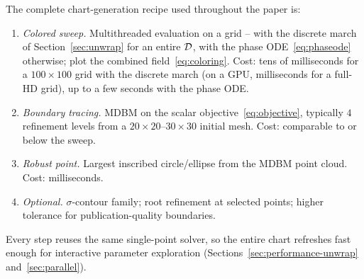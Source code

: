 The complete chart-generation recipe used throughout the paper is:
\begin{enumerate}
  \item \emph{Colored sweep.} Multithreaded evaluation on a grid -- with the
    discrete march of Section~\ref{sec:unwrap} for an entire $\mathcal{D}$, with
    the phase ODE~\eqref{eq:phaseode} otherwise; plot the combined
    field~\eqref{eq:coloring}. Cost: tens of milliseconds for a
    $100\times100$ grid with the discrete march (on a GPU, milliseconds for
    a full-HD grid), up to a few seconds with the phase ODE.
  \item \emph{Boundary tracing.} MDBM on the scalar
    objective~\eqref{eq:objective}, typically $4$ refinement levels from a
    $20\times20$--$30\times30$ initial mesh. Cost: comparable to or below
    the sweep.
  \item \emph{Robust point.} Largest inscribed circle/ellipse from the MDBM
    point cloud. Cost: milliseconds.
  \item \emph{Optional.} $\sigma$-contour family; root refinement at
    selected points; higher tolerance for publication-quality boundaries.
\end{enumerate}
Every step reuses the same single-point solver, so the entire chart refreshes
fast enough for interactive parameter exploration
(Sections~\ref{sec:performance-unwrap} and~\ref{sec:parallel}).